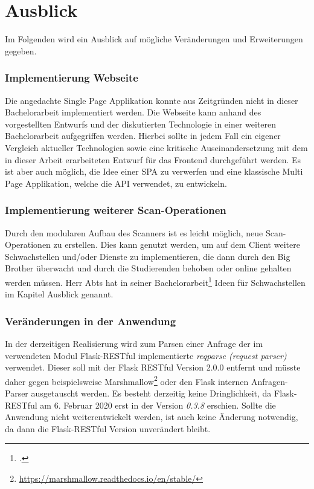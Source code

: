 \newpage
\section{Ausblick}
\label{sec:Ausblick}
Im Folgenden wird ein Ausblick auf mögliche Veränderungen und Erweiterungen gegeben.

\subsubsection{Implementierung Webseite}
Die angedachte Single Page Applikation konnte aus Zeitgründen nicht in dieser Bachelorarbeit implementiert werden. Die Webseite kann anhand des vorgestellten Entwurfs und der diskutierten Technologie in einer weiteren Bachelorarbeit aufgegriffen werden. Hierbei sollte in jedem Fall ein eigener Vergleich aktueller Technologien sowie eine kritische Auseinandersetzung mit dem in dieser Arbeit erarbeiteten Entwurf für das Frontend durchgeführt werden. Es ist aber auch möglich, die Idee einer SPA zu verwerfen und eine klassische Multi Page Applikation, welche die API verwendet, zu entwickeln.

\subsubsection{Implementierung weiterer Scan-Operationen}
Durch den modularen Aufbau des Scanners ist es leicht möglich, neue Scan-Operationen zu erstellen. Dies kann genutzt werden, um auf dem Client weitere Schwachstellen und/oder Dienste zu implementieren, die dann durch den Big Brother überwacht und durch die Studierenden behoben oder online gehalten werden müssen. Herr Abts hat in seiner Bachelorarbeit\footcite{abtsUeberarbeitungUndErweiterung2016} Ideen für Schwachstellen im Kapitel Ausblick genannt. 

\subsubsection{Veränderungen in der Anwendung}
In der derzeitigen Realisierung wird zum Parsen einer Anfrage der im verwendeten Modul Flask-RESTful implementierte \textit{reqparse (request parser)} verwendet. Dieser soll mit der Flask RESTful Version 2.0.0 entfernt und müsste daher gegen beispielsweise Marshmallow\footnote{\url{https://marshmallow.readthedocs.io/en/stable/}} oder den Flask internen Anfragen-Parser ausgetauscht werden. Es besteht derzeitig keine Dringlichkeit, da Flask-RESTful am 6. Februar 2020 erst in der Version \textit{0.3.8} erschien. Sollte die Anwendung nicht weiterentwickelt werden, ist auch keine Änderung notwendig, da dann die Flask-RESTful Version unverändert bleibt.

